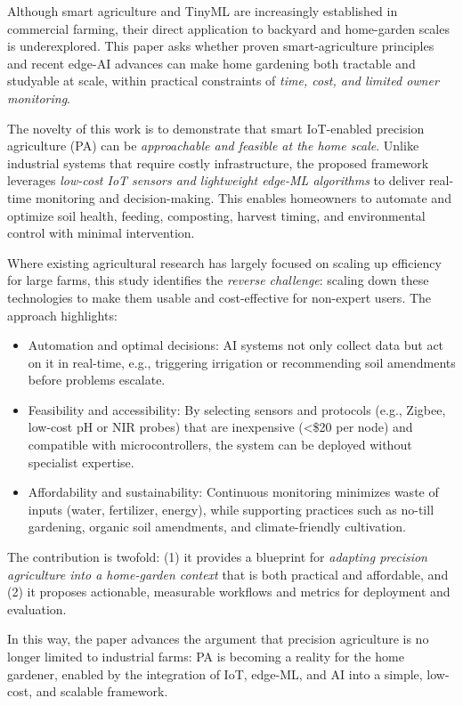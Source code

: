 \documentclass{sigchi}
\begin{document}
Although smart agriculture and TinyML are increasingly established in commercial farming, their direct application to backyard and home-garden scales is underexplored. This paper asks whether proven smart-agriculture principles and recent edge-AI advances can make home gardening both tractable and studyable at scale, within practical constraints of \emph{time, cost, and limited owner monitoring}.

The novelty of this work is to demonstrate that smart IoT-enabled precision agriculture (PA) can be \emph{approachable and feasible at the home scale}. Unlike industrial systems that require costly infrastructure, the proposed framework leverages \emph{low-cost IoT sensors and lightweight edge-ML algorithms} to deliver real-time monitoring and decision-making. This enables homeowners to automate and optimize soil health, feeding, composting, harvest timing, and environmental control with minimal intervention.

Where existing agricultural research has largely focused on scaling up efficiency for large farms, this study identifies the \emph{reverse challenge}: scaling down these technologies to make them usable and cost-effective for non-expert users. The approach highlights:
\begin{itemize}
\item Automation and optimal decisions: AI systems not only collect data but act on it in real-time, e.g., triggering irrigation or recommending soil amendments before problems escalate.
\item Feasibility and accessibility: By selecting sensors and protocols (e.g., Zigbee, low-cost pH or NIR probes) that are inexpensive (<\$20 per node) and compatible with microcontrollers, the system can be deployed without specialist expertise.
\item Affordability and sustainability: Continuous monitoring minimizes waste of inputs (water, fertilizer, energy), while supporting practices such as no-till gardening, organic soil amendments, and climate-friendly cultivation.
\end{itemize}
The contribution is twofold: (1) it provides a blueprint for \emph{adapting precision agriculture into a home-garden context} that is both practical and affordable, and (2) it proposes actionable, measurable workflows and metrics for deployment and evaluation.

In this way, the paper advances the argument that precision agriculture is no longer limited to industrial farms: PA is becoming a reality for the home gardener, enabled by the integration of IoT, edge-ML, and AI into a simple, low-cost, and scalable framework.
\end{document}
